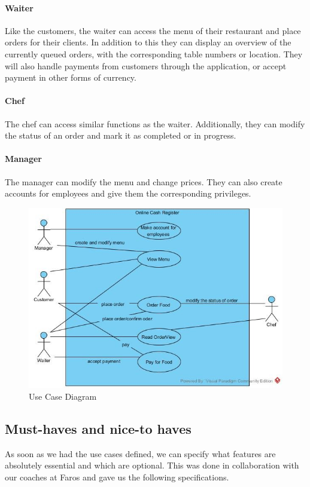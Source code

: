 \documentclass[12pt]{article}
\begin{document}
\paragraph{Waiter}
Like the customers, the waiter can access the menu of their restaurant and place orders for their clients. In addition to this they can display an overview of the currently queued orders, with the corresponding table numbers or location. They will also handle payments from customers through the application, or accept payment in other forms of currency.
\paragraph{Chef}
The chef can access similar functions as the waiter. Additionally, they can modify the status of an order and mark it as completed or in progress.
\paragraph{Manager}
The manager can modify the menu and change prices. They can also create accounts for employees and give them the corresponding privileges.\\

\begin{figure}[h!]
	\centering
	\includegraphics[width=0.75\linewidth]{usecase.jpg}
	\caption{Use Case Diagram}
	\label{fig:usecase}
\end{figure}

\subsection{Must-haves and nice-to haves}
As soon as we had the use cases defined, we can specify what features are absolutely essential and which are optional. This was done in collaboration with our coaches at Faros and gave us the following specifications.
\end{document}
